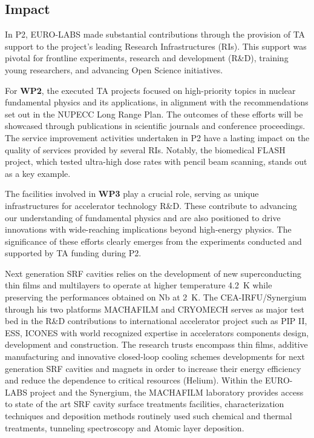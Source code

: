 
\subsection{Impact}
\label{sec:impact}


In P2, EURO-LABS made substantial contributions through the provision of TA support to the project's leading Research Infrastructures (RIs). This support was pivotal for frontline experiments, research and development (R\&D), training young researchers, and advancing Open Science initiatives.

For \textbf{WP2}, the executed TA projects focused on high-priority topics in nuclear fundamental physics and its applications, in alignment with the recommendations set out in the NUPECC Long Range Plan. The outcomes of these efforts will be showcased through publications in scientific journals and conference proceedings. The service improvement activities undertaken in P2 have a lasting impact on the quality of services provided by several RIs. Notably, the biomedical FLASH project, which tested ultra-high dose rates with pencil beam scanning, stands out as a key example.

The facilities involved in \textbf{WP3} play a crucial role, serving as unique infrastructures for accelerator technology R\&D. These contribute to advancing our understanding of fundamental physics and are also positioned to drive innovations with wide-reaching implications beyond high-energy physics. The significance of these efforts clearly emerges from the experiments conducted and supported by TA funding during P2.

Next generation SRF cavities relies on the development of new superconducting thin films and multilayers to operate at higher temperature \SI{4.2}{K} while preserving the performances obtained on Nb at \SI{2}{K}. The CEA-IRFU/Synergium through his two platforms MACHAFILM and CRYOMECH serves as major test bed in the R\&D contributions to international accelerator project such as PIP II, ESS, ICONES with world recognized expertise in accelerators components design, development and construction. The research trusts encompass thin films, additive manufacturing and innovative closed-loop cooling schemes developments for next generation SRF cavities and magnets in order to increase their energy efficiency and reduce the dependence to critical resources (Helium). Within the EURO-LABS project and the Synergium, the MACHAFILM laboratory provides access to state of the art SRF cavity surface treatments facilities, characterization techniques and deposition methods routinely used such chemical and thermal treatments, tunneling spectroscopy and Atomic layer deposition. 


